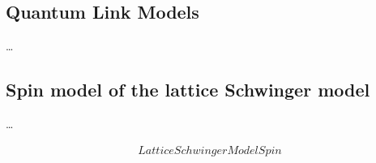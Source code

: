 \documentclass[../main.tex]{subfiles} %
\begin{document}
\subsection{Quantum Link Models}

\ldots






\subsection{Spin model of the lattice Schwinger model}

\ldots

\begin{align} \label{eq:LatticeSchwingerModelHamiltonianSpin}
    LatticeSchwingerModelSpin
\end{align}
\end{document}
